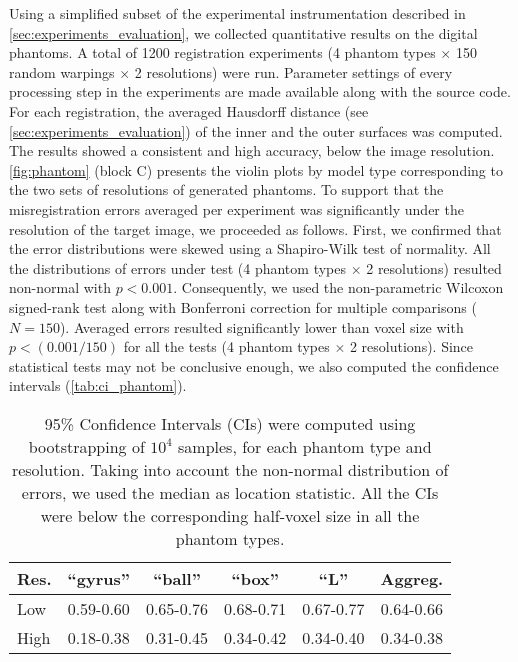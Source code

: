 Using a simplified subset of the experimental instrumentation described in
  \autoref{sec:experiments_evaluation}, we collected quantitative results on the digital
  phantoms.
A total of 1200 registration experiments (4 phantom types $\times$ 150 random warpings
  $\times$ 2 resolutions) were run.
Parameter settings of every processing step in the experiments are made available along with
  the source code.
For each registration, the averaged Hausdorff distance (see \autoref{sec:experiments_evaluation})
  of the inner and the outer surfaces was computed.
The results showed a consistent and high accuracy, below the image resolution.
\autoref{fig:phantom} (block C) presents the violin plots by model type corresponding
  to the two sets of resolutions of generated phantoms.
To support that the misregistration errors averaged per experiment was significantly
  under the resolution of the target image, we proceeded as follows.
First, we confirmed that the error distributions were skewed using a Shapiro-Wilk test of
  normality.
All the distributions of errors under test (4 phantom types $\times$ 2 resolutions) resulted
  non-normal with $p<0.001$.
Consequently, we used the non-parametric Wilcoxon signed-rank test along with Bonferroni
  correction for multiple comparisons ($N=150$).
Averaged errors resulted significantly lower than voxel size with $p < (0.001 / 150)$
  for all the tests (4 phantom types $\times$ 2 resolutions).
Since statistical tests may not be conclusive enough, we also computed the confidence intervals
  (\autoref{tab:ci_phantom}).


\begin{table}
		\centering
		\footnotesize
    \begin{tabular}{lccccc}
    Res. & ``gyrus'' & ``ball''  & ``box''   & ``L''     & Aggreg.    \\\hline
    Low  & 0.59-0.60 & 0.65-0.76 & 0.68-0.71 & 0.67-0.77 & 0.64-0.66  \\
    High & 0.18-0.38 & 0.31-0.45 & 0.34-0.42 & 0.34-0.40 & 0.34-0.38  \\
    \hline
    \end{tabular}
    \caption{95\% Confidence Intervals (CIs) were computed using bootstrapping of $10^4$ samples,
      for each phantom type and resolution.
    Taking into account the non-normal distribution of errors, we used the median as location
  		statistic.
    All the CIs were below the corresponding half-voxel size in all the phantom types.}\label{tab:ci_phantom}
\end{table}

